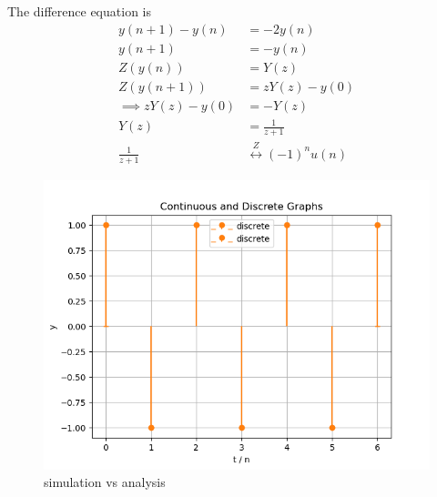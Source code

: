 \documentclass[journal,12pt,twocolumn]{IEEEtran}
\begin{document}
The difference equation is 
\begin{align}
y(n+1)-y(n)&=-2y(n)\\
y(n+1)&=-y(n)\\
Z(y(n))&=Y(z)\\
Z(y(n+1))&=zY(z)-y(0)\\
\implies zY(z)-y(0)&=-Y(z)\\
Y(z)&=\frac{1}{z+1}\\
\frac{1}{z+1}&\overset{Z}\longleftrightarrow (-1)^{n}u(n)
\end{align}
\begin{figure}[h!]
    \centering
    \includegraphics[width=\columnwidth]{figs/graph.png}
    \caption{simulation vs analysis}
\end{figure}
\end{document}
